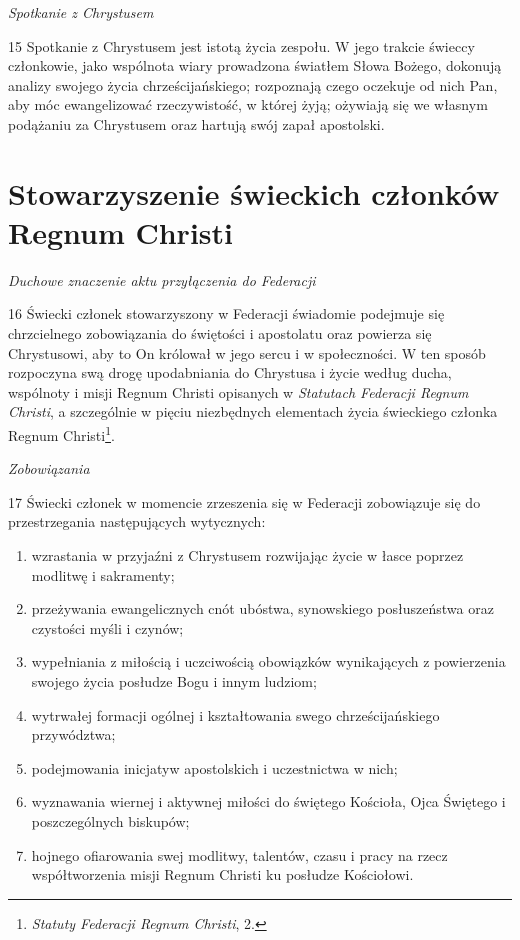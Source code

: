 ﻿\documentclass{report}
\newcommand{\lett}[1]{\lettrine[findent=6pt]{#1}{}}
\newcommand{\ssec}[1]{\vspace{1em}\textit{#1}\vspace{.5em}\nopagebreak}
\begin{document}
\ssec{Spotkanie z Chrystusem}


\lett{15} Spotkanie z Chrystusem jest istotą życia zespołu. W jego trakcie świeccy członkowie, jako wspólnota wiary prowadzona światłem Słowa Bożego, dokonują analizy swojego życia chrześcijańskiego; rozpoznają czego oczekuje od nich Pan, aby móc ewangelizować rzeczywistość, w której żyją; ożywiają się we własnym podążaniu za Chrystusem oraz hartują swój zapał apostolski.


\chapter{Stowarzyszenie świeckich członków Regnum Christi}


\ssec{ Duchowe znaczenie aktu przyłączenia do Federacji}


\lett{16} Świecki członek stowarzyszony w Federacji świadomie podejmuje się chrzcielnego zobowiązania do świętości i apostolatu oraz powierza się Chrystusowi, aby to On królował w jego sercu i w społeczności. W ten sposób rozpoczyna swą drogę upodabniania do Chrystusa i życie według ducha, wspólnoty i misji Regnum Christi opisanych w {\em Statutach Federacji Regnum Christi}, a szczególnie w pięciu niezbędnych  elementach życia świeckiego członka Regnum Christi\footnote{{\em Statuty Federacji Regnum Christi}, 2.}.
 
\ssec{Zobowiązania}


\lett{17} Świecki członek w momencie zrzeszenia się w Federacji zobowiązuje się do  przestrzegania następujących wytycznych:


\begin{enumerate}


\item wzrastania w przyjaźni z Chrystusem rozwijając życie w łasce poprzez modlitwę i sakramenty;


\item przeżywania ewangelicznych cnót ubóstwa, synowskiego posłuszeństwa oraz czystości myśli i czynów;


\item wypełniania z miłością i uczciwością obowiązków wynikających z powierzenia swojego życia posłudze Bogu i innym ludziom;


\item wytrwałej formacji ogólnej i kształtowania swego chrześcijańskiego przywództwa;


\item podejmowania inicjatyw apostolskich i uczestnictwa w nich;


\item wyznawania wiernej i aktywnej miłości do świętego Kościoła, Ojca Świętego i poszczególnych biskupów;


\item hojnego ofiarowania swej modlitwy, talentów, czasu i pracy na rzecz współtworzenia misji Regnum Christi ku posłudze Kościołowi.


\end{enumerate}
\end{document}
